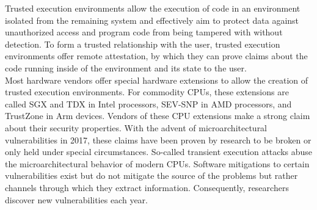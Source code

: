 


Trusted execution environments allow the execution of code in an environment
isolated from the remaining system and effectively aim to protect data against
unauthorized access and program code from being tampered with without detection.
To form a trusted relationship with the user, trusted execution environments
offer remote attestation, by which they can prove claims about the code running
inside of the environment and its state to the user.\\

Most hardware vendors offer special hardware extensions to allow the creation of
trusted execution environments. For commodity CPUs, these extensions are called
SGX and TDX in Intel processors, SEV-SNP in AMD processors, and TrustZone in Arm
devices. Vendors of these CPU extensions make a strong claim about their
security properties. With the advent of microarchitectural vulnerabilities in
2017, these claims have been proven by research to be broken or only held under
special circumstances. So-called transient execution attacks abuse the
microarchitectural behavior of modern CPUs. Software mitigations to certain
vulnerabilities exist but do not mitigate the source of the problems but rather
channels through which they extract information. Consequently, researchers
discover new vulnerabilities each year. \\

